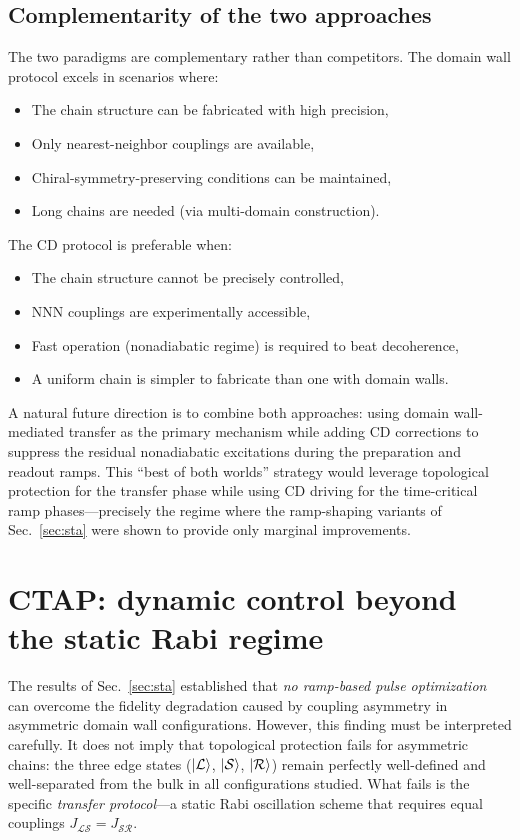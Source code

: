 \documentclass[
  reprint,
  amsmath,
  amssymb,
  aps,
  prb,
  floatfix,
  longbibliography,
]{revtex4-2}
\newcommand{\JLS}{J_{\mathcal{LS}}}
\newcommand{\JSR}{J_{\mathcal{SR}}}
\newcommand{\ketL}{\ket{\mathcal{L}}}
\newcommand{\ketS}{\ket{\mathcal{S}}}
\newcommand{\ketR}{\ket{\mathcal{R}}}
\begin{document}
\subsection{Complementarity of the two approaches}
\label{sec:comp_complementarity}

The two paradigms are complementary rather than competitors. The domain wall
protocol excels in scenarios where:
\begin{itemize}
  \item The chain structure can be fabricated with high precision,
  \item Only nearest-neighbor couplings are available,
  \item Chiral-symmetry-preserving conditions can be maintained,
  \item Long chains are needed (via multi-domain construction).
\end{itemize}

The CD protocol is preferable when:
\begin{itemize}
  \item The chain structure cannot be precisely controlled,
  \item NNN couplings are experimentally accessible,
  \item Fast operation (nonadiabatic regime) is required to beat decoherence,
  \item A uniform chain is simpler to fabricate than one with domain walls.
\end{itemize}

A natural future direction is to combine both approaches: using domain
wall-mediated transfer as the primary mechanism while adding CD corrections
to suppress the residual nonadiabatic excitations during the preparation
and readout ramps. This ``best of both worlds'' strategy would leverage
topological protection for the transfer phase while using CD driving for
the time-critical ramp phases---precisely the regime where the ramp-shaping
variants of Sec.~\ref{sec:sta} were shown to provide only marginal improvements.

\section{CTAP: dynamic control beyond the static Rabi regime}
\label{sec:ctap}

The results of Sec.~\ref{sec:sta} established that \emph{no ramp-based
pulse optimization} can overcome the fidelity degradation caused by coupling
asymmetry in asymmetric domain wall configurations. However, this finding
must be interpreted carefully. It does not imply that topological protection
fails for asymmetric chains: the three edge states ($\ketL$, $\ketS$, $\ketR$)
remain perfectly well-defined and well-separated from the bulk in all
configurations studied. What fails is the specific \emph{transfer protocol}---a
static Rabi oscillation scheme that requires equal couplings $\JLS = \JSR$.
\end{document}
